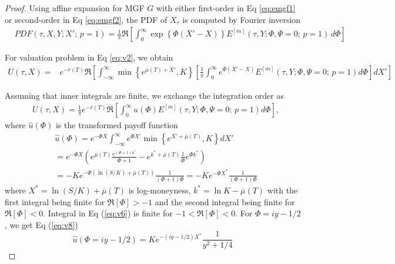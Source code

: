 \documentclass[pdftex,11pt,a4paper] {article}
\begin{document}
\begin{proof}
Using affine expansion for MGF $G$  with either first-order in Eq \eqref{eq:emgf1} or second-order in Eq \eqref{eq:emgf2}, the PDF of $X_{\tau}$ is computed by Fourier inversion
\begin{equation}\label {eq:v3}
\begin{split}
& PDF(\tau,X,Y; X';\,p=1) = \frac{1}{\pi}\Re\left[ \int^{\infty}_{0}\exp \left\{ \Phi (X'-X) \right\} E^{[m]}(\tau,Y; \Phi,\Psi=0;\,p=1)\,d\Phi\right]
\end{split}
\end{equation}


For valuation problem in Eq \eqref{eq:v2}, we obtain
\begin{equation*}
\begin{split}
    U(\tau, X) = &e^{-\overline{r}(T)}\Re\left[ \int^{\infty}_{-\infty}\min\left\{e^{\overline{\mu}(T)+X'},K\right\} \left[\frac{1}{\pi} \int^{\infty}_{0}e^{\Phi (X'-X)} E^{[m]}(\tau,Y; \Phi,\Psi=0;\,p=1)d\Phi\right]dX'\right]
\end{split} 
\end{equation*}

Assuming that inner integrals are finite, we exchange the integration order as
\begin{equation} \label {eq:v5}
\begin{split}
  & U(\tau, X) = \frac{1}{\pi} e^{-\overline{r}(T)} \Re\left[\int^{\infty}_{0}\widehat{u}(\Phi)E^{[m]}(\tau,Y; \Phi,\Psi=0;\,p=1)d\Phi\right],
\end{split} 
\end{equation}
where $\widehat{u}(\Phi)$ is the transformed payoff function
\begin{equation} \label {eq:v6}
\begin{split}
&   \widehat{u}(\Phi)  =  e^{-\Phi X}\int^{\infty}_{-\infty}e^{\Phi X'} \min\left\{e^{ X'+\overline{\mu}(T)},K\right\}  dX'  \\
& =e^{-\Phi X} \left( e^{\overline{\mu}(T)}  \frac{e^{(\Phi+1) k^{*}}}{\Phi+1} - e^{k^{*}+\overline{\mu}(T)}\frac{1}{\Phi}e^{\Phi k^{*}}\right) \\
		& =-  Ke^{-\Phi\left(\ln (S/K)+ \overline{\mu}(T)\right)}\frac{1}{(\Phi+1)\Phi} = -K e^{-\Phi X^{*}} \frac{1}{(\Phi+1)\Phi}
\end{split} 
\end{equation}
where $X^{*}=\ln(S/K)+\overline{\mu}(T)$ is log-moneyness, $k^{*}=\ln K-\overline{\mu}(T)$ with the first integral being finite for $\Re[\Phi]>-1$ and the second integral being finite for $\Re[\Phi]<0$. Integral in Eq (\ref{eq:v6}) is finite for $-1<\Re[\Phi]<0$. For $\Phi=iy-1/2$, we get Eq (\ref{eq:v8})
\begin{equation}\label{eq:v7}
\widehat{u}(\Phi = iy-1/2) = 
K e^{-(iy-1/2) X^{*}}  \frac{1}{y^{2}+1/4}
\end{equation}
\end{proof}
\end{document}
